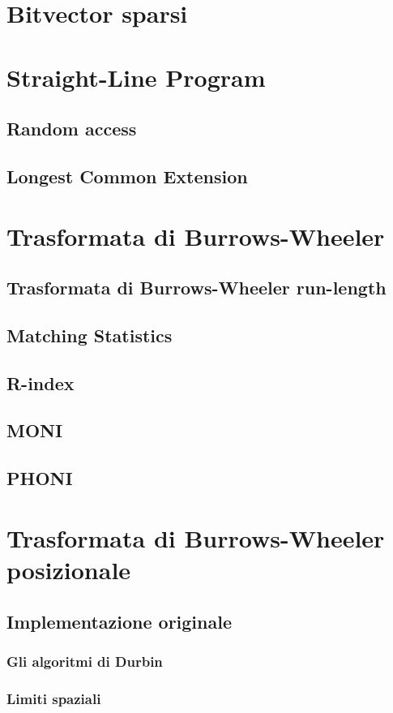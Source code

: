 \documentclass[a4paper,12pt, oneside]{book}
\begin{document}
\section{Bitvector sparsi}
\section{Straight-Line Program}
\subsection{Random access}
\subsection{Longest Common Extension}
\section{Trasformata di Burrows-Wheeler}
\subsection{Trasformata di Burrows-Wheeler run-length}
\subsection{Matching Statistics}
\subsection{R-index}
\subsection{MONI}
\subsection{PHONI}
\section{Trasformata di Burrows-Wheeler posizionale}
\subsection{Implementazione originale}
\subsubsection{Gli algoritmi di Durbin}
\subsubsection{Limiti spaziali}
\end{document}
